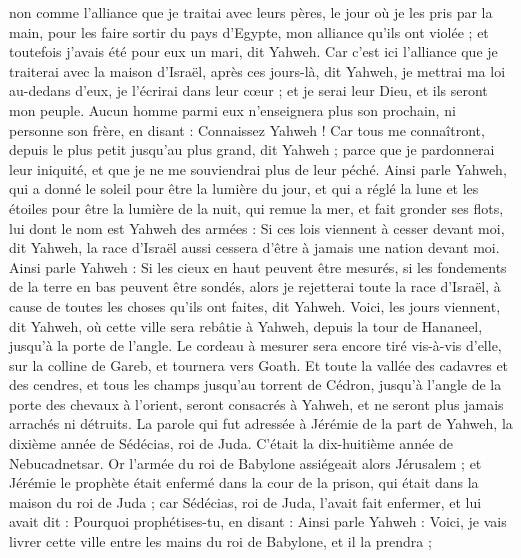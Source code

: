 \begin{multicols}{2}
non comme l'alliance que je traitai avec leurs pères, le jour où je les pris par la main, pour les faire sortir du pays d'Egypte, mon alliance qu'ils ont violée ; et toutefois j’avais été pour eux un mari, dit Yahweh.
Car c'est ici l'alliance que je traiterai avec la maison d'Israël, après ces jours-là, dit Yahweh, je mettrai ma loi au-dedans d'eux, je l'écrirai dans leur cœur ; et je serai leur Dieu, et ils seront mon peuple.
Aucun homme parmi eux n'enseignera plus son prochain, ni personne son frère, en disant : Connaissez Yahweh ! Car tous me connaîtront, depuis le plus petit jusqu'au plus grand, dit Yahweh ; parce que je pardonnerai leur iniquité, et que je ne me souviendrai plus de leur péché.
Ainsi parle Yahweh, qui a donné le soleil pour être la lumière du jour, et qui a réglé la lune et les étoiles pour être la lumière de la nuit, qui remue la mer, et fait gronder ses flots, lui dont le nom est Yahweh des armées :
Si ces lois viennent à cesser devant moi, dit Yahweh, la race d'Israël aussi cessera d'être à jamais une nation devant moi.
Ainsi parle Yahweh : Si les cieux en haut peuvent être mesurés, si les fondements de la terre en bas peuvent être sondés, alors je rejetterai toute la race d'Israël, à cause de toutes les choses qu'ils ont faites, dit Yahweh.
Voici, les jours viennent, dit Yahweh, où cette ville sera rebâtie à Yahweh, depuis la tour de Hananeel, jusqu'à la porte de l'angle.
Le cordeau à mesurer sera encore tiré vis-à-vis d'elle, sur la colline de Gareb, et tournera vers Goath.
Et toute la vallée des cadavres et des cendres, et tous les champs jusqu'au torrent de Cédron, jusqu'à l'angle de la porte des chevaux à l'orient, seront consacrés à Yahweh, et ne seront plus jamais arrachés ni détruits.
\VerseOne{}La parole qui fut adressée à Jérémie de la part de Yahweh, la dixième année de Sédécias, roi de Juda. C'était la dix-huitième année de Nebucadnetsar.
Or l'armée du roi de Babylone assiégeait alors Jérusalem ; et Jérémie le prophète était enfermé dans la cour de la prison, qui était dans la maison du roi de Juda ;
car Sédécias, roi de Juda, l'avait fait enfermer, et lui avait dit : Pourquoi prophétises-tu, en disant : Ainsi parle Yahweh : Voici, je vais livrer cette ville entre les mains du roi de Babylone, et il la prendra ;

\end{multicols}
